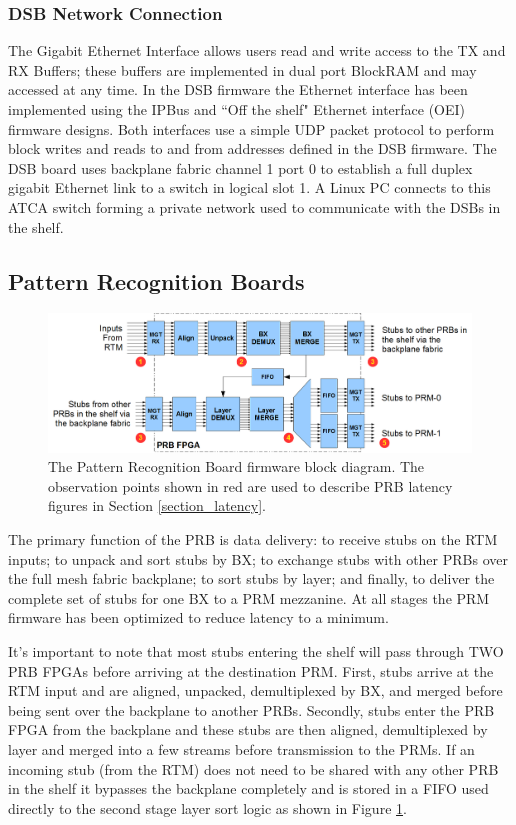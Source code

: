 \documentclass[letterpaper]{article}
\begin{document}
\subsubsection{DSB Network Connection}

The Gigabit Ethernet Interface allows users read and write access to the TX and RX Buffers; these buffers are implemented in dual port BlockRAM and may accessed at any time.  In the DSB firmware the Ethernet interface has been implemented using the IPBus\cite{ipbus} and ``Off the shelf" Ethernet interface (OEI)\cite{oei} firmware designs.  Both interfaces use a simple UDP packet protocol to perform block writes and reads to and from addresses defined in the DSB firmware. The DSB board uses backplane fabric channel 1 port 0 to establish a full duplex gigabit Ethernet link to a switch in logical slot 1.   A Linux PC connects to this ATCA switch forming a private network used to communicate with the DSBs in the shelf.

\subsection{Pattern Recognition Boards}
\label{section_prb}

\begin{figure}
\centering
\includegraphics[width=15cm]{prb.png}
\caption{The Pattern Recognition Board firmware block diagram.  The observation points shown in red are used to describe PRB latency figures in Section \ref{section_latency}.}
\label{prb_fw}
\end{figure}

The primary function of the PRB is data delivery: to receive stubs on the RTM inputs; to unpack and sort stubs by BX; to exchange stubs with other PRBs over the full mesh fabric backplane; to sort stubs by layer; and finally, to deliver the complete set of stubs for one BX to a PRM mezzanine.  At all stages the PRM firmware has been optimized to reduce latency to a minimum.  

It's important to note that most stubs entering the shelf will pass through TWO PRB FPGAs before arriving at the destination PRM.  First, stubs arrive at the RTM input and are aligned, unpacked, demultiplexed by BX, and merged before being sent over the backplane to another PRBs. Secondly, stubs enter the PRB FPGA from the backplane and these stubs are then aligned, demultiplexed by layer and merged into a few streams before transmission to the PRMs.  If an incoming stub (from the RTM) does not need to be shared with any other PRB in the shelf it bypasses the backplane completely and is stored in a FIFO used directly to the second stage layer sort logic as shown in Figure \ref{prb_fw}.
\end{document}
